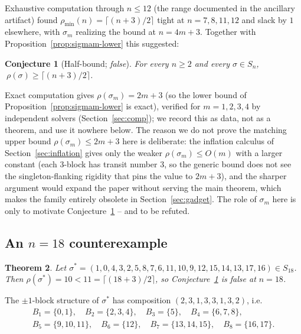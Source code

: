 \documentclass[11pt]{article}
\newtheorem{theorem}{Theorem}[section]
\newtheorem{conjecture}[theorem]{Conjecture}
\theoremstyle{definition}
\newcommand{\pmin}{\rho_{\min}}
\begin{document}
Exhaustive computation through $n\le12$ (the range documented in the ancillary
artifact) found $\pmin(n)=\lceil(n+3)/2\rceil$ tight at $n=7,8,11,12$ and slack by $1$
elsewhere, with $\sigma_m$ realizing the bound at $n=4m+3$. Together with
Proposition~\ref{prop:sigmam-lower} this suggested:

\begin{conjecture}[Half-bound; \emph{false}]\label{conj:half}
For every $n\ge2$ and every $\sigma\in S_n$, $\ \rho(\sigma)\ge\lceil(n+3)/2\rceil$.
\end{conjecture}

Exact computation gives $\rho(\sigma_m)=2m+3$ (so the lower bound of
Proposition~\ref{prop:sigmam-lower} is exact), verified for $m=1,2,3,4$ by independent
solvers (Section~\ref{sec:comp}); we record this as data, not as a theorem, and use it
nowhere below. The reason we do not prove the matching upper bound
$\rho(\sigma_m)\le2m+3$ here is deliberate: the inflation calculus of
Section~\ref{sec:inflation} gives only the weaker $\rho(\sigma_m)\le O(m)$ with a
larger constant (each $3$-block has transit number $3$, so the generic bound does not
see the singleton-flanking rigidity that pins the value to $2m+3$), and the
sharper argument would expand the paper without serving the main theorem, which makes
the family entirely obsolete in Section~\ref{sec:gadget}. The role of $\sigma_m$ here
is only to motivate Conjecture~\ref{conj:half} -- and to be refuted.

\subsection{An \texorpdfstring{$n=18$}{n=18} counterexample}\label{subsec:n18}

\begin{theorem}\label{thm:n18}
Let $\sigma^\ast=(1,0,4,3,2,5,8,7,6,11,10,9,12,15,14,13,17,16)\in S_{18}$. Then
$\rho(\sigma^\ast)=10<11=\lceil(18+3)/2\rceil$, so Conjecture~\ref{conj:half} is false
at $n=18$.
\end{theorem}

The $\pm1$-block structure of $\sigma^\ast$ has composition $(2,3,1,3,3,1,3,2)$, i.e.\
\begin{gather*}
  B_1=\{0,1\},\quad B_2=\{2,3,4\},\quad B_3=\{5\},\quad B_4=\{6,7,8\},\\
  B_5=\{9,10,11\},\quad B_6=\{12\},\quad B_7=\{13,14,15\},\quad B_8=\{16,17\}.
\end{gather*}
\end{document}
